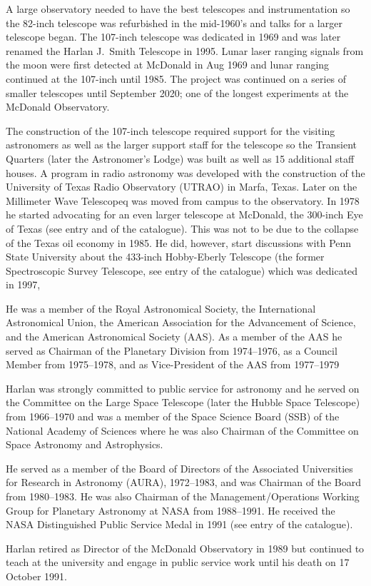 A large observatory needed to have the best telescopes and
instrumentation so the 82-inch telescope was refurbished in the
mid-1960's and talks for a larger telescope began.  The
107-inch telescope was dedicated in 1969 and was later renamed the
Harlan J.~Smith Telescope in 1995. Lunar laser ranging signals from
the moon were first detected at McDonald in Aug 1969 and lunar
ranging continued at the 107-inch until 1985. The project was
continued on a series of smaller telescopes until September 2020; one
of the longest experiments at the McDonald Observatory.

The construction of the 107-inch telescope required support for the
visiting astronomers as well as the larger support staff for the
telescope so the Transient Quarters (later the Astronomer's Lodge) was
built as well as 15 additional staff houses. A program in radio
astronomy was developed with the construction of the University of
Texas Radio Observatory (UTRAO) in Marfa, Texas. Later on the
Millimeter Wave Telescopeq was moved from campus to the
observatory. In 1978 he started advocating for an even larger
telescope at McDonald, the 300-inch Eye of Texas (see
entry  and  of the catalogue). This was not to
be due to the collapse of the Texas oil economy in 1985. He did,
however, start discussions with Penn State University about the
433-inch Hobby-Eberly Telescope (the former Spectroscopic Survey
Telescope, see entry  of the catalogue) which was dedicated
in 1997,

He was a member of the Royal Astronomical Society, the International
Astronomical Union, the American Association for the Advancement of
Science, and the American Astronomical Society (AAS). As a member of
the AAS he served as Chairman of the Planetary Division from
1974--1976, as a Council Member from 1975--1978, and as Vice-President
of the AAS from 1977--1979

Harlan was strongly committed to public service for astronomy and he
served on the Committee on the Large Space Telescope
(later the Hubble Space Telescope) from 1966--1970 and was a member of the
Space Science Board (SSB) of the National Academy of Sciences where he
was also Chairman of the Committee on Space Astronomy and
Astrophysics.

He served as a member of the Board of Directors of the Associated
Universities for Research in Astronomy (AURA), 1972--1983, and was
Chairman of the Board from 1980--1983. He was also Chairman of the
Management/Operations Working Group for Planetary Astronomy at NASA
from 1988--1991.  He received the NASA Distinguished Public Service
Medal in 1991 (see entry  of the catalogue).

Harlan retired as Director of the McDonald Observatory in 1989  but
continued to teach at the university and engage in public service work
until his death on 17 October 1991.


